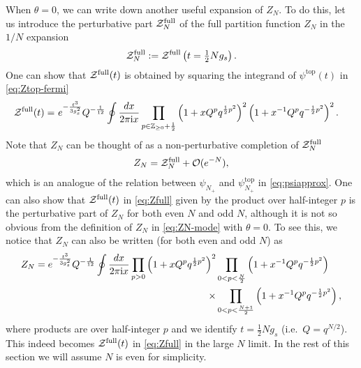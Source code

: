 \documentclass[11pt]{article}
\newcommand{\ri}{{\rm i}}
\def\th{\theta}
\newcommand{\hf}{\frac{1}{2}}
\renewcommand{\[}{\begin{eqnarray}}
\renewcommand{\]}{\end{eqnarray}}
\newcommand{\Zefull}{{\cal Z}^{\text{full}}}
\begin{document}
When $\th=0$, we can write down another useful expansion of $Z_N$.
To do this, let us introduce 
the perturbative part $\Zefull_N$ of the full partition function
$Z_N$ in the $1/N$ expansion
\begin{align}
\Zefull_N := \Zefull\left(t=\tfrac{1}{2}Ng_s\right).
\label{eq:ZefullN-def}
\end{align}
%
One can show that $\Zefull(t)$
is obtained by
squaring the integrand of $\psi^{\text{top}}(t)$ in \eqref{eq:Ztop-fermi}
%
\begin{align}
\begin{aligned}
\Zefull(t)
 =&\ e^{-\frac{t^3}{3g_s^2}}Q^{-\frac{1}{12}}
 \oint\frac{dx}{2\pi\ri x}
 \prod_{p\in\mathbb{Z}_{\geq0}+\hf}\left(1+xQ^p q^{\hf p^2}\right)^2
            \left(1+x^{-1}Q^p q^{-\hf p^2}\right)^2.
 \end{aligned}
\label{eq:Zfull}
\end{align}
Note that $Z_N$ can be thought of as a
non-perturbative completion of $\Zefull_N$
\begin{align}
Z_N = \Zefull_N+\mathcal{O}(e^{-N}),
\label{eq:ZNapprox}
\end{align}
which is an analogue of the relation between
$\psi_{N_+}$ and $\psi^{\text{top}}_{N_+}$ in \eqref{eq:psiapprox}. 
One can also show  that $\Zefull(t)$ in \eqref{eq:Zfull} 
given by the product over half-integer $p$
is the perturbative part of $Z_N$ for both even $N$ and odd $N$,
although it is not so obvious from the
definition of  $Z_N$
in \eqref{eq:ZN-mode} with $\th=0$.
To see this, we notice that $Z_N$
can also be written (for both even and odd $N$) as
%
\begin{align}
\begin{aligned}
Z_N
 = e^{-\frac{t^3}{3g_s^2}}Q^{-\frac{1}{12}}
 \oint\frac{dx}{2\pi\ri x}
 \prod_{p>0}\left(1+xQ^{p}q^{\hf p^2}\right)^2
 &\prod_{0<p<\frac{N}{2}}
  \left(1+x^{-1}Q^{p}q^{-\hf p^2}\right)\\
\times
 &\prod_{0<p<\frac{N+1}{2}}
  \left(1+x^{-1}Q^{p}q^{-\hf p^2}\right),
\end{aligned}
\end{align}
%
where products are over half-integer $p$
and we identify $t=\hf Ng_s$ (i.e.~$Q=q^{N/2}$). This indeed becomes 
$\Zefull(t)$ in \eqref{eq:Zfull} in the large $N$ limit.
In the rest of this section we will assume $N$ is even
for simplicity.
\end{document}
